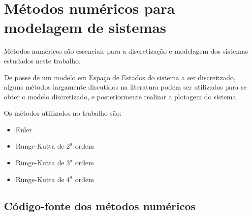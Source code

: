 \chapter{Métodos numéricos para modelagem de sistemas}

    Métodos numéricos são essenciais para a discretização e modelagem
    dos sistemas estudados neste trabalho.
    
    De posse de um modelo em Espaço de Estados do sistema a ser discretizado,
    alguns métodos largamente discutidos na literatura podem ser utilizados
    para se obter o modelo discretizado, e posteriormente realizar a plotagem
    do sistema.
    
    Os métodos utilizados no trabalho são:
    
    \begin{itemize}
        \item Euler
        \item Runge-Kutta de $2^a$ ordem
        \item Runge-Kutta de $3^a$ ordem
        \item Runge-Kutta de $4^a$ ordem
    \end{itemize}
    

\section{Código-fonte dos métodos numéricos}
    
